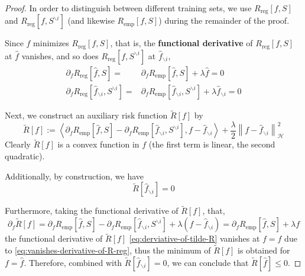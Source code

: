 \documentclass[a4paper, 12pt, mtpro2, authoryear]{elegantpaper}
\begin{document}
\begin{proof}
    In order to distinguish between different training sets, we use $R_{\text{reg}}[f,S]$ and $R_{\text{reg}}[f,S^{\backslash i}]$ (and likewise $R_{\text{emp}}[f,S]$) during the remainder of the proof.

    Since $\hat{f}$ minimizes $R_{\text{reg}}[f,S]$, that is, the \textbf{functional derivative} \citep{stephane_canu_lecture_2014} of $R_{\text{reg}}[f,S]$ at $\hat{f}$ vanishes, and so does $R_{\text{reg}}[f,S^{\backslash i}]$ at $\hat{f}_{\backslash i}$,
    \begin{equation}
        \label{eq:vanishes-derivative-of-R-reg}
        \begin{aligned}
            \partial_{f}R_{\text{reg}}\left[\hat{f},S\right]=                               & \partial_{f}R_{\text{emp}}\left[\hat{f},S\right]+\lambda\hat{f}=0                                              \\
            \partial_{f}R_{\text{reg}}\left[\hat{f}_{\backslash i},S^{\backslash i}\right]= & \partial_{f}R_{\text{emp}}\left[\hat{f}_{\backslash i},S^{\backslash i}\right]+\lambda\hat{f}_{\backslash i}=0
        \end{aligned}
    \end{equation}

    Next, we construct an auxiliary risk function $\tilde{R}[f]$ by
    \begin{equation}
        \tilde{R}[f]:=\left\langle\partial_{f}R_{\text{emp}}\left[\hat{f},S\right]-\partial_{f}R_{\text{emp}}\left[\hat{f}_{\backslash i},S^{\backslash i}\right],f-\hat{f}_{\backslash i}\right\rangle+\frac{\lambda}{2}\left\|f-\hat{f}_{\backslash i}\right\|_{\mathcal{H}}^{2}
    \end{equation}
    Clearly $\tilde{R}[f]$ is a convex function in $f$ (the first term is linear, the second quadratic).

    Additionally, by construction, we have
    \begin{equation}
        \tilde{R}[\hat{f}_{\backslash i}]=0
    \end{equation}

    Furthermore, taking the functional derivative of $\tilde{R}[f]$, that,
    \begin{equation}
        \label{eq:derviative-of-tilde-R}
        \partial_{f}\tilde{R}[f]=\partial_{f}R_{\text{emp}}\left[\hat{f},S\right]-\partial_{f}R_{\text{emp}}\left[\hat{f}_{\backslash i},S^{\backslash i}\right]+\lambda\left(f-\hat{f}_{\backslash i}\right)=\partial_{f}R_{\text{emp}}\left[\hat{f},S\right]+\lambda f
    \end{equation}
    the functional derivative of $\tilde{R}[f]$ \eqref{eq:derviative-of-tilde-R} vanishes at $f=\hat{f}$ due to \eqref{eq:vanishes-derivative-of-R-reg}, thus the minimum of $\tilde{R}[f]$ is obtained for $f=\hat{f}$. Therefore, combined with $\tilde{R}[\hat{f}_{\backslash i}]=0$, we can conclude that $\tilde{R}[\hat{f}]\leq 0$.


\end{proof}
\end{document}
